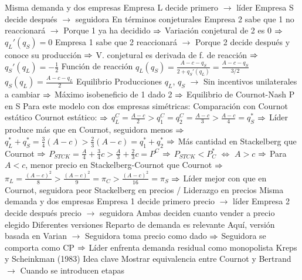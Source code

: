 \documentclass{nuevotema}
\begin{document}
\begin{esquemal}
				\4 Misma demanda y dos empresas
				\4[] Empresa L decide primero $\to$ líder
				\4[] Empresa S decide después $\to$ seguidora
				\4 En términos conjeturales
				\4[] Empresa 2 sabe que 1 no reaccionará
				\4[] $\to$ Porque 1 ya ha decidido
				\4[] $\Rightarrow$ Variación conjetural de 2 es 0
				\4[] $\Rightarrow$ $q_L'(q_S) = 0 $
				\4[] Empresa 1 sabe que 2 reaccionará
				\4[] $\to$ Porque 2 decide después y conoce su producción
				\4[] $\Rightarrow$ V. conjetural es derivada de f. de reacción
				\4[] $\Rightarrow$ $q_S'(q_L) = -\frac{1}{2}$
				\4 Función de reacción
				\4[] $q_L(q_S) = \frac{A-c-q_S}{2+q_S'(q_L)} = \frac{A-c-q_S}{3/2}$
				\4[] $q_S(q_L) = \frac{A-c-q_L}{2}$
				\4[] 
				\4 Equilibrio
				\4[] Producciones $q_L$, $q_S$
				\4[] $\to$ Sin incentivos unilaterales a cambiar
				\4[] $\Rightarrow$ Máximo isobeneficio de 1 dado 2
				\4[] $\Rightarrow$ Equilibrio de Cournot-Nash P en S
				\4[] Para este modelo con dos empresas simétricas:
				\4[] 
				\4[] 
				\4[] 
				\4[] 
				\4 Comparación con Cournot estático
				\4[] Cournot estático:
				\4[] $\Rightarrow$ $q_{L}^C = \frac{A-c}{2} > q_1^C = q_2^C = \frac{A-c}{3} > \frac{A-c}{4} = q_{S}^* $
				\4[] $\Rightarrow$ Líder produce más que en Cournot, seguidora menos
				\4[] $\Rightarrow$ $q_{L}^* + q_{S}^* = \frac{3}{4} (A-c) > \frac{2}{3} (A-c) = q_1^* + q_2^*$
				\4[] $\Rightarrow$ Más cantidad en Stackelberg que Cournot
				\4[] $\Rightarrow$ $P_{STCK} = \frac{A}{4} + \frac{3}{4}c > \frac{A}{3} + \frac{2}{3}c = P^C $
				\4[] $\Rightarrow$ $ P_{STCK} < P^*_C $ $\iff$ $A > c$
				\4[] $\Rightarrow$ Para $A<c$, menor precio en Stackelberg-Cournot que Cournot
				\4[] $\Rightarrow$ $\pi_{L} = \frac{(A-c)^2}{8} > \frac{(A-c)^2}{9} = \pi_C > \frac{(A-c)^2}{16} = \pi_{S}$
				\4[] $\Rightarrow$ Líder mejor con que en Cournot, seguidora peor
			\3 Stackelberg en precios / Liderazgo en precios
				\4 Misma demanda y dos empresas
				\4[] Empresa 1 decide primero precio $\to$ líder
				\4[] Empresa 2 decide después precio $\to$ seguidora
				\4[] Ambas deciden cuanto vender a precio elegido
				\4 Diferentes versiones
				\4[] Reparto de demanda es relevante
				\4[] Aquí, versión basada en Varian
				\4[] $\to$ Seguidora toma precio como dado
				\4[] $\Rightarrow$ Seguidora se comporta como CP
				\4[] $\Rightarrow$ Líder enfrenta demanda residual como monopolista
			\3 Kreps y Scheinkman (1983)
				\4 Idea clave
				\4[] Mostrar equivalencia entre Cournot y Bertrand
				\4[] $\to$ Cuando se introducen etapas

\end{esquemal}
\end{document}

